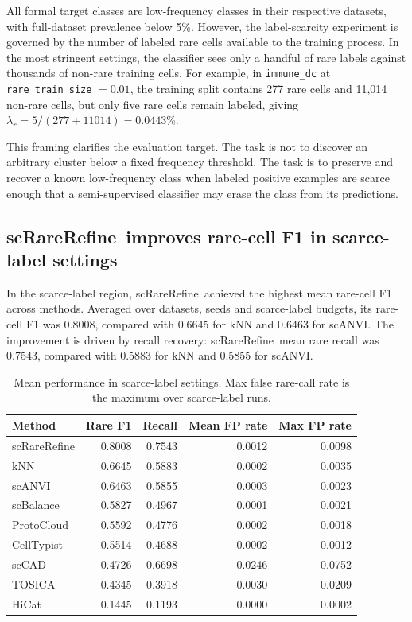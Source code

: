 \documentclass[11pt]{article}
\newcommand{\method}{scRareRefine}
\newcommand{\rare}{r}
\newcommand{\rts}{\texttt{rare\_train\_size}}
\begin{document}
All formal target classes are low-frequency classes in their respective
datasets, with full-dataset prevalence below 5\%. However, the label-scarcity
experiment is governed by the number of labeled rare cells available to the
training process. In the most stringent settings, the classifier sees only a
handful of rare labels against thousands of non-rare training cells. For
example, in \texttt{immune\_dc} at \rts{} $=0.01$, the training split contains
277 rare cells and 11,014 non-rare cells, but only five rare cells remain
labeled, giving $\lambda_\rare = 5/(277+11014)=0.0443\%$.

This framing clarifies the evaluation target. The task is not to discover an
arbitrary cluster below a fixed frequency threshold. The task is to preserve
and recover a known low-frequency class when labeled positive examples are
scarce enough that a semi-supervised classifier may erase the class from its
predictions.

\subsection{\method\ improves rare-cell F1 in scarce-label settings}

In the scarce-label region, \method\ achieved the highest mean rare-cell F1
across methods. Averaged over datasets, seeds and scarce-label budgets, its
rare-cell F1 was 0.8008, compared with 0.6645 for kNN and 0.6463 for scANVI.
The improvement is driven by recall recovery: \method\ mean rare recall was
0.7543, compared with 0.5883 for kNN and 0.5855 for scANVI.

\begin{table}[t]
\centering
\caption{Mean performance in scarce-label settings. Max false rare-call rate is the maximum over scarce-label runs.}
\label{tab:scarce}
\small
\begin{tabular}{lrrrr}
\toprule
Method & Rare F1 & Recall & Mean FP rate & Max FP rate \\
\midrule
\method & 0.8008 & 0.7543 & 0.0012 & 0.0098 \\
kNN & 0.6645 & 0.5883 & 0.0002 & 0.0035 \\
scANVI & 0.6463 & 0.5855 & 0.0003 & 0.0023 \\
scBalance & 0.5827 & 0.4967 & 0.0001 & 0.0021 \\
ProtoCloud & 0.5592 & 0.4776 & 0.0002 & 0.0018 \\
CellTypist & 0.5514 & 0.4688 & 0.0002 & 0.0012 \\
scCAD & 0.4726 & 0.6698 & 0.0246 & 0.0752 \\
TOSICA & 0.4345 & 0.3918 & 0.0030 & 0.0209 \\
HiCat & 0.1445 & 0.1193 & 0.0000 & 0.0002 \\
\bottomrule
\end{tabular}
\end{table}
\end{document}
